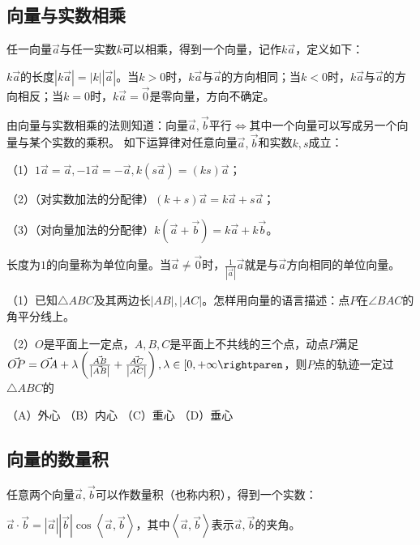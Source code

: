 \subsection{向量与实数相乘}
任一向量\(\vec{a}\)与任一实数\(k\)可以相乘，得到一个向量，记作\(k \vec{a}\)，定义如下：

\(k \vec{a}\)的长度\(\left| k \vec{a} \right| = \left| k \right| \left| \vec{a} \right|\)。当\(k > 0\)时，\(k \vec{a}\)与\(\vec{a}\)的方向相同；当\(k < 0\)时，\(k \vec{a}\)与\(\vec{a}\)的方向相反；当\(k = 0\)时，\(k \vec{a} = \vec{0}\)是零向量，方向不确定。

由向量与实数相乘的法则知道：向量\(\vec{a} , \vec{b}\)平行\(\Leftrightarrow\)其中一个向量可以写成另一个向量与某个实数的乘积。
\newpage
如下运算律对任意向量\(\vec{a} , \vec{b}\)和实数\(k , s\)成立：

（1）\(1 \vec{a} = \vec{a} , - 1 \vec{a} = - \vec{a} , k \left( s \vec{a} \right) = \left( k s \right) \vec{a}\)；

（2）（对实数加法的分配律）\(\left( k + s \right) \vec{a} = k \vec{a} + s \vec{a}\)；

（3）（对向量加法的分配律）\(k \left( \vec{a} + \vec{b} \right) = k \vec{a} + k \vec{b}\)。

长度为\(1\)的向量称为单位向量。当\(\vec{a} \ne \vec{0}\)时，\(\frac{1}{\left| \vec{a} \right|} \vec{a}\)就是与\(\vec{a}\)方向相同的单位向量。

\begin{example}
（1）已知\(\triangle A B C\)及其两边长\(\left| A B \right| , \left| A C \right|\)。怎样用向量的语言描述：点\(P\)在\(\angle B A C\)的角平分线上。

（2）\(O\)是平面上一定点，\(A , B , C\)是平面上不共线的三个点，动点\(P\)满足\(\vec{O P} = \vec{O A} + \lambda \left( \frac{\vec{A B}}{\left| \vec{A B} \right|} + \frac{\vec{A C}}{\left| \vec{A C} \right|} \right) , \lambda \in \lbrack 0 , + \infty \rightparen\)，则\(P\)点的轨迹一定过\(\triangle A B C\)的

（A）外心 \quad （B）内心 \quad （C）重心 \quad （D）垂心
\end{example}

\subsection{向量的数量积}
任意两个向量\(\vec{a} , \vec{b}\)可以作数量积（也称内积），得到一个实数：

\(\vec{a} \cdot \vec{b} = \left| \vec{a} \right| \left| \vec{b} \right| \cos \left\langle \vec{a} , \vec{b} \right\rangle\)，其中\(\left\langle \vec{a} , \vec{b} \right\rangle\)表示\(\vec{a} , \vec{b}\)的夹角。

